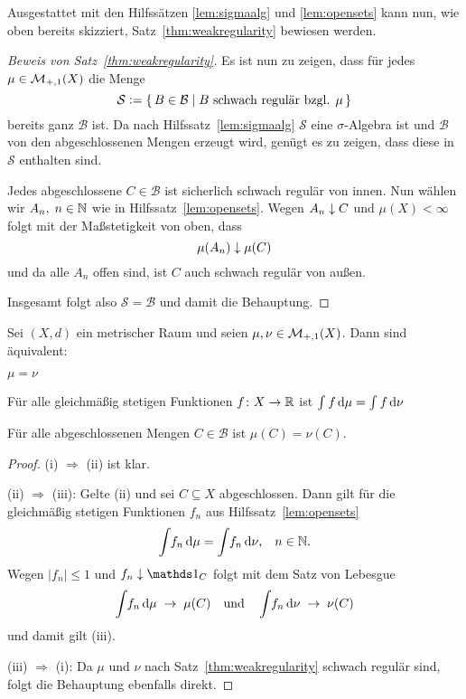 \documentclass[../main/main.tex]{subfiles}
\begin{document}
	Ausgestattet mit den Hilfssätzen \ref{lem:sigmaalg} und \ref{lem:opensets} kann nun, 
	wie oben bereits skizziert, Satz~\ref{thm:weakregularity} bewiesen werden.

	\begin{proof}[Beweis von Satz~\ref{thm:weakregularity}]
		Es ist nun zu zeigen, dass für jedes $\mu \in \mathcal{M}_{+,1}(X)$
		die Menge 
		$$\mathcal{S} \vcentcolon = \left\{\, B \in \mathcal{B} \; | \; B \text{ schwach regulär bzgl. } \mu \,\right\}$$
		bereits ganz $\mathcal{B}$ ist. 
		Da nach Hilfssatz~\ref{lem:sigmaalg} $\mathcal{S}$ eine $\sigma$-Algebra ist und 
		$\mathcal{B}$ von den abgeschlossenen Mengen erzeugt wird, genügt es zu zeigen, 
		dass diese in $\mathcal{S}$ enthalten sind. 
		
		Jedes abgeschlossene $C \in \mathcal{B}$ ist sicherlich schwach regulär von innen. 
		Nun wählen wir $A_n, \; n \in \mathbb{N}$ wie in Hilfssatz~\ref{lem:opensets}. 
		Wegen $A_n \downarrow C$ und $\mu(X) < \infty$ folgt mit der Maßstetigkeit von oben, dass
		$$\mu(A_n) \downarrow \mu(C)$$
		und da alle $A_n$ offen sind, ist $C$ auch schwach regulär von außen.
		
		Insgesamt folgt also $\mathcal{S} = \mathcal{B}$ und damit die Behauptung.
	\end{proof}

	\begin{Satz}
		Sei $(X,d)$ ein metrischer Raum und seien $\mu, \nu \in \mathcal{M}_{+,1}(X)$. Dann sind äquivalent:
		\begin{equivalentthm}
			\item $\mu = \nu$
			\item Für alle gleichmäßig stetigen Funktionen $f \colon X \to \mathbb{R}$ ist
					 $\int_{} \, f \, \mathrm{d}\mu = \int_{} \, f \, \mathrm{d}\nu$
			\item Für alle abgeschlossenen Mengen $C \in \mathcal{B}$ ist $\mu(C) = \nu(C)$.
		\end{equivalentthm}
	\end{Satz}

	\begin{proof}
		(i) $\Rightarrow$ (ii) ist klar.
		
		(ii) $\Rightarrow$ (iii): Gelte (ii) und sei $C \subseteq X$ abgeschlossen. 
		Dann gilt für die gleichmäßig stetigen Funktionen $f_n$ aus Hilfssatz~\ref{lem:opensets}
		$$\int_{} \, f_n \, \mathrm{d}\mu = \int_{} \, f_n \, \mathrm{d}\nu\text{,} \quad n \in \mathbb{N} \text{.}$$
		Wegen $| f_n | \leq 1$ und $f_n \convdown \indfct_C$ folgt mit dem Satz von Lebesgue 
		$$\int_{} \, f_n \, \mathrm{d}\mu \; \to \; \mu(C) \quad \text{und} \quad \int_{} \, f_n \, \mathrm{d}\nu 
			\; \to \; \nu(C)$$
		und damit gilt (iii).
		
		(iii) $\Rightarrow$ (i): Da $\mu$ und $\nu$ nach Satz~\ref{thm:weakregularity} 
		schwach regulär sind, folgt die Behauptung ebenfalls direkt.
	\end{proof}
\end{document}
